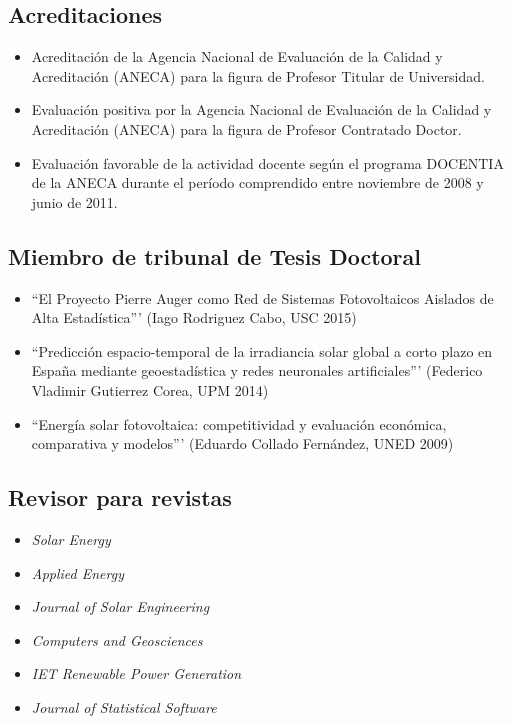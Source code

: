 \documentclass[article, a4paper]{memoir}
\begin{document}
\subsection{Acreditaciones}
\label{sec-15-1}

\begin{itemize}
\item Acreditación de la Agencia Nacional de Evaluación de la Calidad y Acreditación (ANECA) para la figura de Profesor Titular de Universidad.

\item Evaluación positiva por la Agencia Nacional de Evaluación de la Calidad y Acreditación (ANECA) para la figura de Profesor Contratado Doctor.
\end{itemize}


\begin{itemize}
\item Evaluación favorable de la actividad docente según el programa DOCENTIA de la ANECA durante el período comprendido entre noviembre de 2008 y junio de 2011.
\end{itemize}

\subsection{Miembro de tribunal de Tesis Doctoral}
\label{sec-15-2}

\begin{itemize}
\item ``El Proyecto Pierre Auger como Red de Sistemas Fotovoltaicos Aislados de Alta Estadística''' (Iago Rodriguez Cabo, USC 2015)

\item ``Predicción espacio-temporal de la irradiancia solar global a corto plazo en España mediante geoestadística y redes neuronales artificiales''' (Federico Vladimir Gutierrez Corea, UPM 2014)

\item ``Energía solar fotovoltaica: competitividad y evaluación económica, comparativa y modelos''' (Eduardo Collado Fernández, UNED 2009)
\end{itemize}

\subsection{Revisor para revistas}
\label{sec-15-3}

\begin{itemize}
\item \emph{Solar Energy}

\item \emph{Applied Energy}

\item \emph{Journal of Solar Engineering}

\item \emph{Computers and Geosciences}

\item \emph{IET Renewable Power Generation}

\item \emph{Journal of Statistical Software}
\end{itemize}
\end{document}
